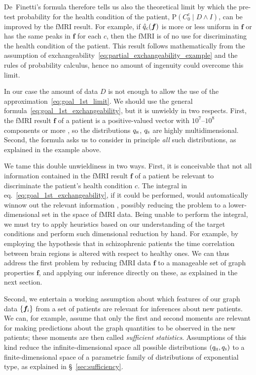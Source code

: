 \documentclass[%
]{frontiersSCNS-nologo} %
\newcommand*{\chap}{ch.} %
\newcommand*{\sect}{\S} %
\newcommand*{\eqn}{eq.}
\newcommand*{\p}{\mathrm{P}}%
\renewcommand*{\|}{\mathpunct{|}}%
\DeclarePairedDelimiter\set{\{}{\}}%
\newcommand*{\yH}{C}
\newcommand*{\yh}{c}
\newcommand*{\yhu}{\textsc{h}}
\newcommand*{\yhd}{\textsc{s}}
\newcommand*{\yD}{D}
\newcommand*{\yf}{\bm{f}}
\newcommand*{\yxx}{f}
\newcommand*{\yx}{\bm{\yxx}}
\newcommand*{\yp}{q}
\newcommand*{\yph}{q_{\yhu}}
\newcommand*{\yps}{q_{\yhd}}
\newcommand*{\ypc}{\Hat{\yp}}
\newcommand*{\yI}{I}
\begin{document}
De~Finetti's formula therefore tells us also the theoretical limit by which
the pre-test probability for the health condition of the patient,
$\p(\yH_0^{\yh} \| \yD \land \yI)$, can be improved by the fMRI result. For
example, if $\ypc_{\yh}(\yf)$ is more or less uniform in $\yf$ or has the
same peaks in $\yf$ for each $\yh$, then the fMRI is of no use for
discriminating the health condition of the patient. This result follows
mathematically from the assumption of
exchangeability~\eqref{eq:partial_exchangeability_example} and the rules of
probability calculus, hence no amount of ingenuity could overcome this
limit.

In our case the amount of data $\yD$ is not enough to allow the use of the
approximation~\eqref{eq:goal_1st_limit}. We should use the general
formula~\eqref{eq:goal_1st_exchangeability}, but it is unwieldy in two
respects. First, the fMRI result $\yf$ of a patient is a positive-valued
vector with $10^7$--$10^8$ components or more \citep{lindquist2008}, so the
distributions $\yph$, $\yps$ are highly multidimensional. Second, the
formula asks us to consider in principle \emph{all} such distributions, as
explained in the example above.

We tame this double unwieldiness in two ways. First, it is conceivable that
not all information contained in the fMRI result $\yf$ of a patient be
relevant to discriminate the patient's health condition $\yh$. The integral
in \eqn~\eqref{eq:goal_1st_exchangeability}, if it could be performed,
would automatically winnow out the relevant information
\citep[\chap~17]{jaynes1994_r2003}, possibly reducing the problem to a
lower-dimensional set in the space of fMRI data. Being unable to perform
the integral, we must try to apply heuristics based on our understanding of
the target conditions and perform such dimensional reduction by hand. For
example, by employing the hypothesis that in schizophrenic patients the
time correlation between brain regions is altered with respect to healthy
ones. We can thus address the first problem by reducing fMRI data $\yf$ to
a manageable set of graph properties $\yx$, and applying our inference
directly on these, as explained in the next section.


Second, we entertain a working assumption about which features of our graph
data $\set{\yx_i}$ from a set of patients are relevant for inferences about
new patients. We can, for example, assume that only the first and second
moments are relevant for making predictions about the graph quantities to
be observed in the new patients; these moments are then called
\emph{sufficient statistics}. Assumptions of this kind reduce the
infinite-dimensional space all possible distributions $(\yph,\yps)$ to a
finite-dimensional space of a parametric family of distributions of
exponential type, as explained in \sect~\ref{sec:sufficiency}.
\end{document}
